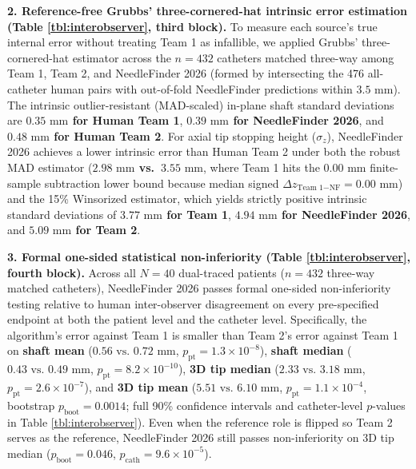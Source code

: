 \documentclass[
  11pt,
]{article}
\begin{document}
\textbf{2. Reference-free Grubbs' three-cornered-hat intrinsic error
estimation (Table \ref{tbl:interobserver}, third block).} To measure
each source's true internal error without treating Team 1 as infallible,
we applied Grubbs' three-cornered-hat estimator across the \(n = 432\)
catheters matched three-way among Team 1, Team 2, and NeedleFinder 2026
(formed by intersecting the 476 all-catheter human pairs with
out-of-fold NeedleFinder predictions within \(3.5\text{ mm}\)). The
intrinsic outlier-resistant (MAD-scaled) in-plane shaft standard
deviations are \textbf{\(0.35\text{ mm}\) for Human Team 1},
\textbf{\(0.39\text{ mm}\) for NeedleFinder 2026}, and
\textbf{\(0.48\text{ mm}\) for Human Team 2}. For axial tip stopping
height (\(\sigma_z\)), NeedleFinder 2026 achieves a lower intrinsic
error than Human Team 2 under both the robust MAD estimator
(\textbf{\(2.98\text{ mm}\) vs.~\(3.55\text{ mm}\)}, where Team 1 hits
the \(0.00\text{ mm}\) finite-sample subtraction lower bound because
median signed \(\Delta z_{\text{Team 1}-\text{NF}} = 0.00\text{ mm}\))
and the 15\% Winsorized estimator, which yields strictly positive
intrinsic standard deviations of \textbf{\(3.77\text{ mm}\) for Team 1},
\textbf{\(4.94\text{ mm}\) for NeedleFinder 2026}, and
\textbf{\(5.09\text{ mm}\) for Team 2}.

\textbf{3. Formal one-sided statistical non-inferiority (Table
\ref{tbl:interobserver}, fourth block).} Across all \(N = 40\)
dual-traced patients (\(n = 432\) three-way matched catheters),
NeedleFinder 2026 passes formal one-sided non-inferiority testing
relative to human inter-observer disagreement on every pre-specified
endpoint at both the patient level and the catheter level. Specifically,
the algorithm's error against Team 1 is smaller than Team 2's error
against Team 1 on \textbf{shaft mean}
(\(0.56\text{ vs. }0.72\text{ mm}\),
\(p_{\text{pt}} = 1.3 \times 10^{-8}\)), \textbf{shaft median}
(\(0.43\text{ vs. }0.49\text{ mm}\),
\(p_{\text{pt}} = 8.2 \times 10^{-10}\)), \textbf{3D tip median}
(\(2.33\text{ vs. }3.18\text{ mm}\),
\(p_{\text{pt}} = 2.6 \times 10^{-7}\)), and \textbf{3D tip mean}
(\(5.51\text{ vs. }6.10\text{ mm}\),
\(p_{\text{pt}} = 1.1 \times 10^{-4}\), bootstrap
\(p_{\text{boot}} = 0.0014\); full 90\% confidence intervals and
catheter-level \(p\)-values in Table \ref{tbl:interobserver}). Even when
the reference role is flipped so Team 2 serves as the reference,
NeedleFinder 2026 still passes non-inferiority on 3D tip median
(\(p_{\text{boot}} = 0.046\), \(p_{\text{cath}} = 9.6 \times 10^{-5}\)).
\end{document}
